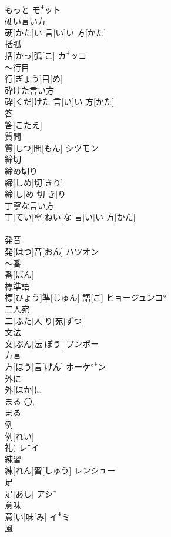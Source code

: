 \documentclass[8pt]{extreport}
\begin{document}
\begin{CJK}{UTF8}{min}
\\	もっと	モꜜット
\\	硬い言い方	
\\	硬[かた]い 言[い]い 方[かた]	
\\	括弧	
\\	括[かっ]弧[こ]	カꜜッコ
\\	～行目	
\\	行[ぎょう]目[め]	
\\	砕けた言い方	
\\	砕[くだ]けた 言[い]い 方[かた]	
\\	答	
\\	答[こたえ]	
\\	質問	
\\	質[しつ]問[もん]	シツモン
\\	締切 
\\	締め切り	
\\	締[しめ]切[きり] 
\\	締[し]め 切[き]り	
\\	丁寧な言い方	
\\	丁[てい]寧[ねい]な 言[い]い 方[かた]	
\\	[ばつ]	
\\	発音	
\\	発[はつ]音[おん]	ハツオン
\\	～番	
\\	番[ばん]	
\\	標準語	
\\	標[ひょう]準[じゅん] 語[ご]	ヒョージュンコ°
\\	二人宛	
\\	二[ふた]人[り]宛[ずつ]	
\\	文法	
\\	文[ぶん]法[ぽう]	ブンポー
\\	方言	
\\	方[ほう]言[げん]	ホーケ°ꜜン
\\	外に	
\\	外[ほか]に	
\\	まる	〇, 
\\	まる	
\\	例	
\\	例[れい] 
\\	礼)	レꜜイ
\\	練習	
\\	練[れん]習[しゅう]	レンシュー
\\	足	
\\	足[あし]	アシꜜ
\\	意味	
\\	意[い]味[み]	イꜜミ
\\	風	

\end{CJK}
\end{document}
